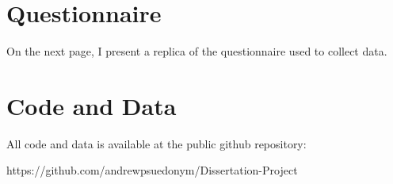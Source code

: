 \documentclass[12pt,a4paper]{report}
\begin{document}













\appendix

\chapter{Questionnaire}\label{app:quest}
On the next page, I present a replica of the questionnaire used to collect data.



\chapter{Code and Data}\label{app:code}

All code and data is available at the public github repository:

https://github.com/andrewpsuedonym/Dissertation-Project



\end{document}
